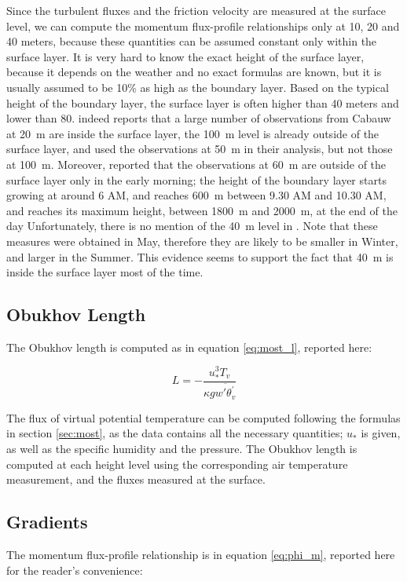 \documentclass[a4paper,11pt]{kth-mag}
\begin{document}
Since the turbulent fluxes and the friction velocity are measured at the surface level, we can compute the momentum flux-profile relationships only at 10, 20 and 40 meters, because these quantities can be assumed constant only within the surface layer. It is very hard to know the exact height of the surface layer, because it depends on the weather and no exact formulas are known, but it is usually assumed to be 10\% as high as the boundary layer. Based on the typical height of the boundary layer, the surface layer is often higher than 40 meters and lower than 80. \cite{cabauw_z0} indeed reports that a large number of observations from Cabauw at \SI{20}{\meter} are inside the surface layer, the \SI{100}{\meter} level is already outside of the surface layer, and \cite{boulder} used the observations at \SI{50}{\meter} in their analysis, but not those at \SI{100}{\meter}. Moreover, \cite{cabauw60m} reported that the observations at \SI{60}{\meter} are outside of the surface layer only in the early morning; the height of the boundary layer starts growing at around 6 AM, and reaches \SI{600}{\meter} between 9.30 AM and 10.30 AM, and reaches its maximum height, between \SI{1800}{\meter} and \SI{2000}{\meter}, at the end of the day Unfortunately, there is no mention of the \SI{40}{\meter} level in \cite{cabauw60m}. Note that these measures were obtained in May, therefore they are likely to be smaller in Winter, and larger in the Summer. This evidence seems to support the fact that \SI{40}{\meter} is inside the surface layer most of the time.

\subsection{Obukhov Length}

The Obukhov length is computed as in equation \ref{eq:most_l}, reported here:

$$
L=-\frac{u_*^3 T_v}{\kappa g \overline{w'\theta^\prime_v}}
$$

The flux of virtual potential temperature can be computed following the formulas in section \ref{sec:most}, as the data contains all the necessary quantities; $u_*$ is given, as well as the specific humidity and the pressure. The Obukhov length is computed at each height level using the corresponding air temperature measurement, and the fluxes measured at the surface.


\subsection{Gradients}
\label{sec:gradients}
The momentum flux-profile relationship is in equation \ref{eq:phi_m}, reported here for the reader's convenience:
\end{document}

